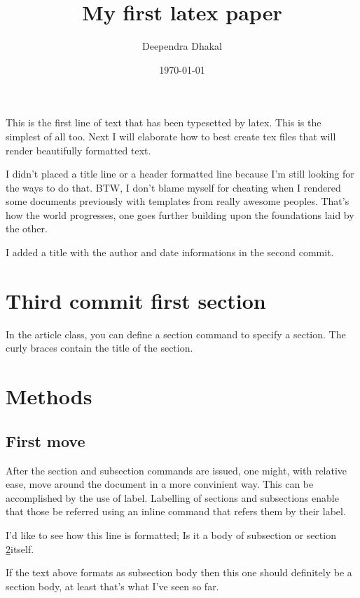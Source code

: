 \documentclass[a4paper,12pt]{article}
\begin{document}
\title{My first latex paper}
\author{Deependra Dhakal}
\date{\today}
\maketitle

This is the first line of text that has been typesetted by latex. This is the simplest of all too. Next I will elaborate how to best create tex files that will render beautifully formatted text.

I didn't placed a title line or a header formatted line because I'm still looking for the ways to do that. BTW, I don't blame myself for cheating when I rendered some documents previously with templates from really awesome peoples. That's how the world progresses, one goes further building upon the foundations laid by the other.

I added a title with the author and date informations in the second commit.

\section{Third commit first section}
In the article class, you can define a section command to specify a section. The curly braces contain the title of the section.

\section{Methods}
\label{methods-sec}

\subsection{First move}
\label{first-method}
After the section and subsection commands are issued, one might, with relative ease, move around the document in a more convinient way. This can be accomplished by the use of label. Labelling of sections and subsections enable that those be referred using an inline command that refers them by their label.

  I'd like to see how this line is formatted; Is it a body of subsection or section \ref{methods-sec}itself.

If the text above formats as subsection body then this one should definitely be a section body, at least that's what I've seen so far.
\end{document}
